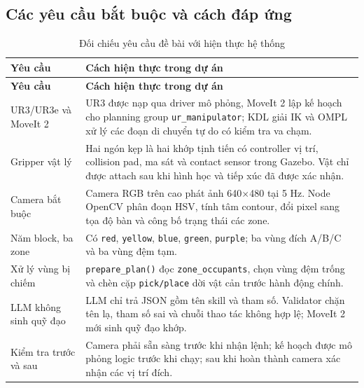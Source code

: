 \documentclass[a4paper,12pt]{article}
\newcommand{\code}[1]{\texttt{#1}}
\newcommand{\skill}[1]{\texttt{#1}}
\begin{document}
\subsection{Các yêu cầu bắt buộc và cách đáp ứng}
\begin{longtable}{p{}p{}}
\caption{Đối chiếu yêu cầu đề bài với hiện thực hệ thống}\label{tab:requirements}\\
\toprule
\textbf{Yêu cầu} & \textbf{Cách hiện thực trong dự án}\\
\midrule
\endfirsthead
\toprule
\textbf{Yêu cầu} & \textbf{Cách hiện thực trong dự án}\\
\midrule
\endhead
UR3/UR3e và MoveIt 2 & UR3 được nạp qua driver mô phỏng, MoveIt 2 lập kế hoạch
cho planning group \code{ur\_manipulator}; KDL giải IK và OMPL xử lý các đoạn
di chuyển tự do có kiểm tra va chạm.\\
Gripper vật lý & Hai ngón kẹp là hai khớp tịnh tiến có controller vị trí,
collision pad, ma sát và contact sensor trong Gazebo. Vật chỉ được attach sau
khi hình học và tiếp xúc đã được xác nhận.\\
Camera bắt buộc & Camera RGB trên cao phát ảnh 640$\times$480 tại 5 Hz. Node
OpenCV phân đoạn HSV, tính tâm contour, đổi pixel sang tọa độ bàn và công bố
trạng thái các zone.\\
Năm block, ba zone & Có \code{red}, \code{yellow}, \code{blue}, \code{green},
\code{purple}; ba vùng đích A/B/C và ba vùng đệm tạm.\\
Xử lý vùng bị chiếm & \code{prepare\_plan()} đọc \code{zone\_occupants}, chọn
vùng đệm trống và chèn cặp \skill{pick/place} dời vật cản trước hành động chính.\\
LLM không sinh quỹ đạo & LLM chỉ trả JSON gồm tên skill và tham số. Validator
chặn tên lạ, tham số sai và chuỗi thao tác không hợp lệ; MoveIt 2 mới sinh quỹ
đạo khớp.\\
Kiểm tra trước và sau & Camera phải sẵn sàng trước khi nhận lệnh; kế hoạch được
mô phỏng logic trước khi chạy; sau khi hoàn thành camera xác nhận các vị trí
đích.\\
\bottomrule
\end{longtable}
\end{document}

